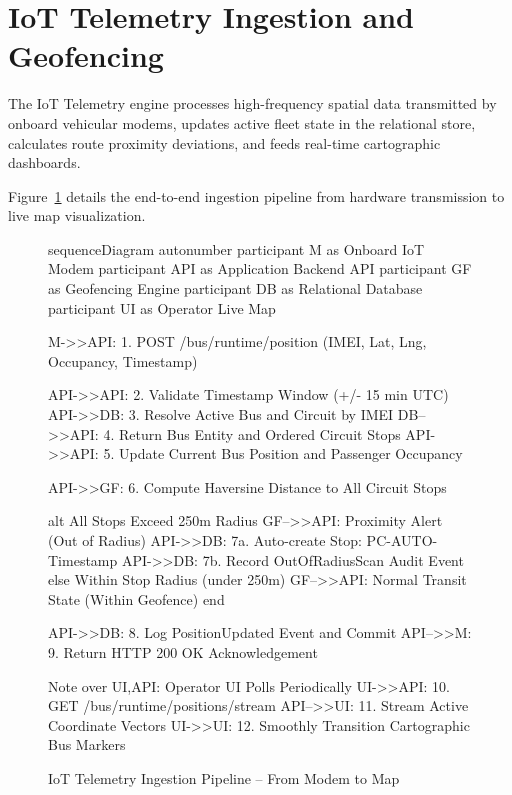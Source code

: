 \section{IoT Telemetry Ingestion and Geofencing}
\label{sec:iot_geofencing}

The IoT Telemetry engine processes high-frequency spatial data transmitted by onboard vehicular modems, updates active fleet state in the relational store, calculates route proximity deviations, and feeds real-time cartographic dashboards.

Figure~\ref{fig:iot_telemetry_pipeline} details the end-to-end ingestion pipeline from hardware transmission to live map visualization.

\begin{figure}[H]
  \centering
  \begin{mermaid}[width=0.98\textwidth]
sequenceDiagram
    autonumber
    participant M as Onboard IoT Modem
    participant API as Application Backend API
    participant GF as Geofencing Engine
    participant DB as Relational Database
    participant UI as Operator Live Map

    M->>API: 1. POST /bus/runtime/position (IMEI, Lat, Lng, Occupancy, Timestamp)

    API->>API: 2. Validate Timestamp Window (+/- 15 min UTC)
    API->>DB: 3. Resolve Active Bus and Circuit by IMEI
    DB-->>API: 4. Return Bus Entity and Ordered Circuit Stops
    API->>API: 5. Update Current Bus Position and Passenger Occupancy

    API->>GF: 6. Compute Haversine Distance to All Circuit Stops

    alt All Stops Exceed 250m Radius
        GF-->>API: Proximity Alert (Out of Radius)
        API->>DB: 7a. Auto-create Stop: PC-AUTO-{Timestamp}
        API->>DB: 7b. Record OutOfRadiusScan Audit Event
    else Within Stop Radius (under 250m)
        GF-->>API: Normal Transit State (Within Geofence)
    end

    API->>DB: 8. Log PositionUpdated Event and Commit
    API-->>M: 9. Return HTTP 200 OK Acknowledgement

    Note over UI,API: Operator UI Polls Periodically
    UI->>API: 10. GET /bus/runtime/positions/stream
    API-->>UI: 11. Stream Active Coordinate Vectors
    UI->>UI: 12. Smoothly Transition Cartographic Bus Markers
  \end{mermaid}
  \caption{IoT Telemetry Ingestion Pipeline -- From Modem to Map}
  \label{fig:iot_telemetry_pipeline}
\end{figure}


